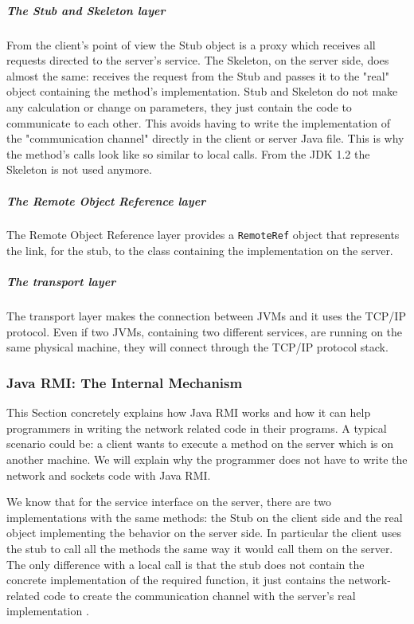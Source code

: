 \subparagraph{The Stub and Skeleton layer}
From the client's point of view the Stub object is a proxy which receives all requests directed to the server's service. The Skeleton, on the server side, does almost the same: receives the request from the Stub and passes it to the "real" object containing the method's implementation. Stub and Skeleton do not make any calculation or change on parameters, they just contain the code to communicate to each other. This avoids having to write the implementation of the "communication channel" directly in the client or server Java file. This is why the method's calls look like so similar to local calls. From the JDK 1.2 the Skeleton is not used anymore.
\subparagraph{The Remote Object Reference layer}
The Remote Object Reference layer provides a \verb|RemoteRef| object that represents the link, for the stub, to the class containing the implementation on the server. 
\subparagraph{The transport layer}
The transport layer makes the connection between JVMs and it uses the TCP/IP protocol. Even if two JVMs, containing two different services, are running on the same physical machine, they will connect through the TCP/IP protocol stack. 


\subsubsection{Java RMI: The Internal Mechanism}
\label{JavaRMIinternalMechanism}

This Section concretely explains how Java RMI works and how it can help programmers in writing the network related code in their programs.
A typical scenario could be: a client wants to execute a method on the server which is on another machine. We will explain why the programmer does not have to write the network and sockets code with Java RMI.

We know that for the service interface on the server, there are two implementations with the same methods: the Stub on the client side and the real object implementing the behavior on the server side. In particular the client uses the stub to call all the methods the same way it would call them on the server. The only difference with a local call is that the stub does not contain the concrete implementation of the required function, it just contains the network-related code to create the communication channel with the server's real implementation \cite{RMI-art4}.

